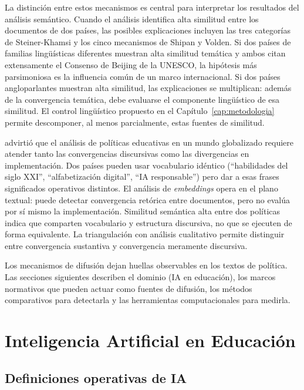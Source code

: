 La distinción entre estos mecanismos es central para interpretar los resultados del análisis semántico. Cuando el análisis identifica alta similitud entre los documentos de dos países, las posibles explicaciones incluyen las tres categorías de Steiner-Khamsi y los cinco mecanismos de Shipan y Volden. Si dos países de familias lingüísticas diferentes muestran alta similitud temática y ambos citan extensamente el Consenso de Beijing de la UNESCO, la hipótesis más parsimoniosa es la influencia común de un marco internacional. Si dos países angloparlantes muestran alta similitud, las explicaciones se multiplican: además de la convergencia temática, debe evaluarse el componente lingüístico de esa similitud. El control lingüístico propuesto en el Capítulo~\ref{cap:metodologia} permite descomponer, al menos parcialmente, estas fuentes de similitud.

\citet{ball1998big} advirtió que el análisis de políticas educativas en un mundo globalizado requiere atender tanto las convergencias discursivas como las divergencias en implementación. Dos países pueden usar vocabulario idéntico (``habilidades del siglo XXI'', ``alfabetización digital'', ``IA responsable'') pero dar a esas frases significados operativos distintos. El análisis de \textit{embeddings} opera en el plano textual: puede detectar convergencia retórica entre documentos, pero no evalúa por sí mismo la implementación. Similitud semántica alta entre dos políticas indica que comparten vocabulario y estructura discursiva, no que se ejecuten de forma equivalente. La triangulación con análisis cualitativo permite distinguir entre convergencia sustantiva y convergencia meramente discursiva.

Los mecanismos de difusión dejan huellas observables en los textos de política. Las secciones siguientes describen el dominio (IA en educación), los marcos normativos que pueden actuar como fuentes de difusión, los métodos comparativos para detectarla y las herramientas computacionales para medirla.


\section{Inteligencia Artificial en Educación}
\label{sec:ia-educacion}

\subsection{Definiciones operativas de IA}

